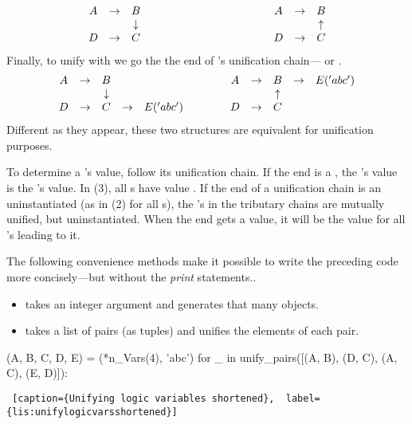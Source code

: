\begin{equation}\label{eq:two}
\begin{array}{c c c c c c c c }
A & \to & B            & \qquad \qquad \qquad \qquad \qquad &   A & \to  & B   \\
  &     & \downarrow   & \qquad \qquad \qquad \qquad \qquad &     &      & \uparrow \\
D & \to & C            & \qquad \qquad \qquad \qquad \qquad &   D & \to  & C
\end{array}
\end{equation}
Finally, to unify  with  we go the the end of 's unification chain--- or .
\begin{equation}\label{eq:three}
\begin{array}{c c c c c c c c c c c}
A & \to & B            &     &          & \quad \quad  \: &   A & \to  & B & \to & E('abc')   \\
  &     & \downarrow   &     &          & \quad \quad \: &     &      &\uparrow & &  \\
D & \to & C            & \to & E('abc') & \quad \quad \: &   D & \to  & C & & 
\end{array}
\end{equation}
Different as they appear, these two structures are equivalent for unification purposes.

To determine a 's value, follow its unification chain. If the end is a , the 's value is the 's value. In (3), all s have value . If the end of a unification chain is an uninstantiated  (as in (2) for all s), the 's in the tributary chains are mutually unified, but uninstantiated. When the end  gets a value, it will be the value for all 's leading to it.

The following convenience methods make it possible to write the preceding code more concisely---but without the \textit{print} statements..
\begin{itemize}
    \item {} takes an integer argument and generates that many  objects.
    \item {} takes a list of pairs (as tuples) and unifies the elements of each pair.
\end{itemize}

\begin{minipage}{\linewidth} \largev   \hrulefill
\begin{python}
(A, B, C, D, E) = (*n_Vars(4), 'abc')
for _ in unify_pairs([(A, B), (D, C), (A, C), (E, D)]):
\end{python}
\begin{lstlisting} [caption={Unifying logic variables shortened},  label={lis:unifylogicvarsshortened}]
\end{lstlisting}
\end{minipage}


